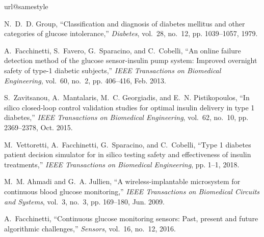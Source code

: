 \documentclass[a4paper, 10 pt, twocolumn]{IEEEtran}
\begin{document}

\begin{thebibliography}{10}
\providecommand{\url}[1]{#1}
\csname url@samestyle\endcsname
\providecommand{\newblock}{\relax}
\providecommand{\bibinfo}[2]{#2}
\providecommand{\BIBentrySTDinterwordspacing}{\spaceskip=0pt\relax}
\providecommand{\BIBentryALTinterwordstretchfactor}{4}
\providecommand{\BIBentryALTinterwordspacing}{\spaceskip=\fontdimen2\font plus
\BIBentryALTinterwordstretchfactor\fontdimen3\font minus
  \fontdimen4\font\relax}
\providecommand{\BIBforeignlanguage}[2]{{%
\expandafter\ifx\csname l@#1\endcsname\relax
\typeout{** WARNING: IEEEtran.bst: No hyphenation pattern has been}%
\typeout{** loaded for the language `#1'. Using the pattern for}%
\typeout{** the default language instead.}%
\else
\language=\csname l@#1\endcsname
\fi
#2}}
\providecommand{\BIBdecl}{\relax}
\BIBdecl

N.~D.~D. Group, ``Classification and diagnosis of diabetes mellitus and other
  categories of glucose intolerance,'' \emph{Diabetes}, vol.~28, no.~12, pp.
  1039--1057, 1979.

A.~Facchinetti, S.~Favero, G.~Sparacino, and C.~Cobelli, ``An online failure
  detection method of the glucose sensor-insulin pump system: Improved
  overnight safety of type-1 diabetic subjects,'' \emph{IEEE Transactions on
  Biomedical Engineering}, vol.~60, no.~2, pp. 406--416, Feb. 2013.

S.~Zavitsanou, A.~Mantalaris, M.~C. Georgiadis, and E.~N. Pistikopoulos, ``In
  silico closed-loop control validation studies for optimal insulin delivery in
  type 1 diabetes,'' \emph{IEEE Transactions on Biomedical Engineering},
  vol.~62, no.~10, pp. 2369--2378, Oct. 2015.

M.~Vettoretti, A.~Facchinetti, G.~Sparacino, and C.~Cobelli, ``Type 1 diabetes
  patient decision simulator for in silico testing safety and effectiveness of
  insulin treatments,'' \emph{IEEE Transactions on Biomedical Engineering}, pp.
  1--1, 2018.

M.~M. Ahmadi and G.~A. Jullien, ``A wireless-implantable microsystem for
  continuous blood glucose monitoring,'' \emph{IEEE Transactions on Biomedical
  Circuits and Systems}, vol.~3, no.~3, pp. 169--180, Jun. 2009.

A.~Facchinetti, ``Continuous glucose monitoring sensors: Past, present and
  future algorithmic challenges,'' \emph{Sensors}, vol.~16, no.~12, 2016.


\end{thebibliography}
\end{document}
